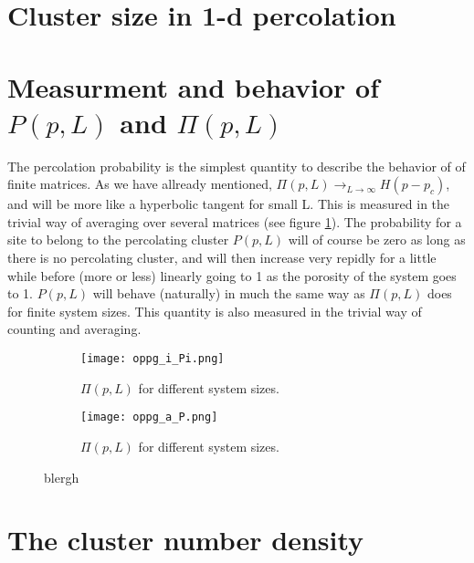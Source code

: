 \documentclass[a4paper,english, 10pt, twoside]{article}
\begin{document}
\section{Cluster size in 1-d percolation}

\section{Measurment and behavior of $P(p,L)$ and $\Pi(p,L)$}\label{section_15}
The percolation probability is the simplest quantity to describe the behavior of of finite matrices. As we have 
allready mentioned, $\Pi(p,L)\to_{L\to\infty}H(p-p_c)$, and will be more like a hyperbolic tangent for small L. 
This is measured in the trivial way of averaging over several matrices (see figure \ref{sect_15:pi}). The probability 
for a site to belong to the percolating cluster $P(p,L)$ will of course be zero as long as there is no percolating 
cluster, and will then increase very repidly for a little while before (more or less) linearly going to 1 as the 
porosity of the system goes to 1. $P(p,L)$ will behave (naturally) in much the same way as $\Pi(p,L)$ does for finite 
system sizes. This quantity is also measured in the trivial way of counting and averaging.

\begin{figure}[H]
\centering
\begin{subfigure}[b]{0.48\textwidth}
 \texttt{[image: oppg\_i\_Pi.png]}
 \caption{$\Pi(p,L)$ for different system sizes.}
 \label{sect_15:pi}
\end{subfigure}
\begin{subfigure}[b]{0.48\textwidth}
  \texttt{[image: oppg\_a\_P.png]}
 \caption{$\Pi(p,L)$ for different system sizes.}
 \label{sect_15:P}
\end{subfigure}
\caption{blergh}
\label{sect_15}
\end{figure}

\section{The cluster number density}
\end{document}
